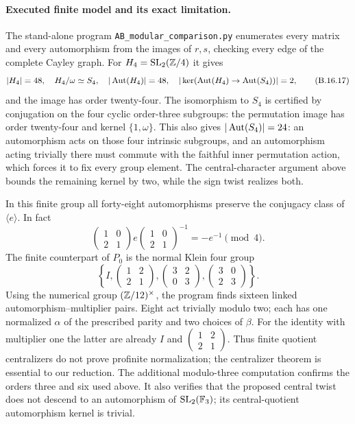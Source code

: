 \paragraph{Executed finite model and its exact limitation.}
The stand-alone program \texttt{AB\_modular\_comparison.py}
enumerates every matrix and every automorphism from the images of
$r,s$, checking every edge of the complete Cayley graph.
For $H_4=\operatorname{SL}_2(\mathbb Z/4)$ it gives
\[
 |H_4|=48,\quad H_4/\omega\simeq S_4,\quad
 |\operatorname{Aut}(H_4)|=48,\quad
 |\ker(\operatorname{Aut}(H_4)\to\operatorname{Aut}(S_4))|=2,
 \tag{B.16.17}
\]
and the image has order twenty-four. The isomorphism to $S_4$
is certified by conjugation on the four cyclic order-three
subgroups: the permutation image has order twenty-four and
kernel $\{1,\omega\}$. This also gives $|\operatorname{Aut}(S_4)|=24$:
an automorphism acts on those four intrinsic subgroups, and
an automorphism acting trivially there must commute with the
faithful inner permutation action, which forces it to fix every
group element. The central-character argument above bounds the
remaining kernel by two, while the sign twist realizes both.

In this finite group all forty-eight automorphisms preserve the
conjugacy class of $\langle e\rangle$. In fact
\[
 \begin{pmatrix}1&0\\2&1\end{pmatrix}
 e\begin{pmatrix}1&0\\2&1\end{pmatrix}^{-1}
       =-e^{-1}\pmod4.
 \tag{B.16.18}
\]
The finite counterpart of $P_0$ is the normal Klein four group
\[
 \left\{I,
 \begin{pmatrix}1&2\\2&1\end{pmatrix},
 \begin{pmatrix}3&2\\0&3\end{pmatrix},
 \begin{pmatrix}3&0\\2&3\end{pmatrix}\right\}.
\]
Using the numerical group $(\mathbb Z/12)^\times$, the program finds
sixteen linked automorphism--multiplier pairs. Eight act
trivially modulo two; each has one normalized $\alpha$ of the
prescribed parity and two choices of $\beta$. For the identity
with multiplier one the latter are already
$I$ and $\left(\begin{smallmatrix}1&2\\2&1\end{smallmatrix}\right)$.
Thus finite quotient centralizers do not prove profinite
normalization; the centralizer theorem is essential to our
reduction. The additional modulo-three computation confirms the
orders three and six used above. It also verifies that the
proposed central twist does not descend to an automorphism of
$\operatorname{SL}_2(\mathbb F_3)$; its central-quotient automorphism kernel is trivial.

